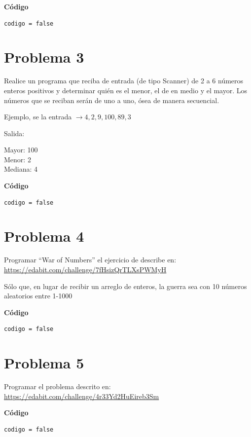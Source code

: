 \documentclass[12pt]{article}
\begin{document}
    \hfil \break
    \textbf{Código}
    \begin{lstlisting}
codigo = false
    \end{lstlisting}

    \section*{Problema 3}
    Realice un programa que reciba de entrada (de tipo Scanner) de 2 a 6 números enteros positivos y determinar quién es el menor, el de en medio y el mayor. Los números que se reciban serán de uno a uno, ósea de manera secuencial.

    Ejemplo, se la entrada $\longrightarrow 4 ,2, 9, 100, 89, 3$
    
    \hfil \break
    Salida:
    
    \hfil \break
    Mayor: 100 \\
    Menor: 2 \\
    Mediana: 4

    \hfil \break
    \textbf{Código}
    \begin{lstlisting}
codigo = false
    \end{lstlisting}

    \section*{Problema 4}
    Programar ``War of Numbers'' el ejercicio de describe en: \\
    \url{https://edabit.com/challenge/7fHsizQrTLXsPWMyH}

    Sólo que, en lugar de recibir un arreglo de enteros, la guerra sea con 10 números aleatorios entre 1-1000

    \hfil \break
    \textbf{Código}
    \begin{lstlisting}
codigo = false
    \end{lstlisting}

    \section*{Problema 5}
    Programar el problema descrito en: \\
    \url{https://edabit.com/challenge/4r33Yd2HuEireb3Sm}

    \hfil \break
    \textbf{Código}
    \begin{lstlisting}
codigo = false
    \end{lstlisting}
\end{document}

